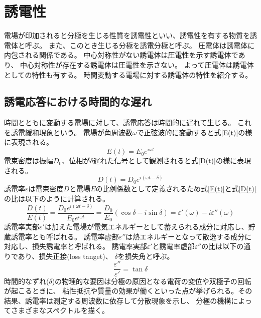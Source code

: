 \documentclass[dvipdfmx,12pt,a4paper]{jreport}
\begin{document}
			\newpage
		\section{誘電性}
		電場が印加されると分極を生じる性質を誘電性といい、誘電性を有する物質を誘電体と呼ぶ。
		また、このとき生じる分極を誘電分極と呼ぶ。
		圧電体は誘電体に内包される関係である。
		中心対称性がない誘電体は圧電性を示す誘電体であり、
		中心対称性が存在する誘電体は圧電性を示さない。
		よって圧電体は誘電体としての特性も有する。
		時間変動する電場に対する誘電体の特性を紹介する。
			\subsection{誘電応答における時間的な遅れ}
			時間とともに変動する電場に対して、誘電応答は時間的に遅れて生じる。
			これを誘電緩和現象という。
			電場が角周波数$\omega$で正弦波的に変動すると式\ref{E(t)}の様に表現される。
			\begin{equation}
				E(t)=E_0 e^{i\omega t}
				\label{E(t)}
			\end{equation}
			電束密度は振幅$D_0$、位相が$\delta$遅れた信号として観測されると式\ref{D(t)}の様に表現される。
			\begin{equation}
				D(t)=D_0 e^{i(\omega t-\delta)}
				\label{D(t)}
			\end{equation}
			誘電率$\varepsilon$は電束密度$D$と電場$E$の比例係数として定義されるため式\ref{E(t)}と式\ref{D(t)}
			の比は以下のように計算される。
			\begin{equation}
				\frac{D(t)}{E(t)}=\frac{D_0e^{i(\omega t-\delta)}}{E_0 e^{i\omega t}}
				=\frac{D_0}{E_0}\left(\cos\delta-i\sin\delta\right)=\varepsilon'(\omega)-i\varepsilon''(\omega)
			\end{equation}
			誘電率実部$\varepsilon'$は加えた電場が電気エネルギーとして蓄えられる成分に対応し、貯蔵誘電率とも呼ばれる。
			誘電率虚部$\varepsilon''$は熱エネルギーとなって散逸する成分に対応し、損失誘電率と呼ばれる。
			誘電率実部$\varepsilon'$と誘電率虚部$\varepsilon''$の比は以下の通りであり、損失正接(loss tanget)、
			$\delta$を損失角と呼ぶ。
			\begin{equation}
				\frac{\varepsilon''}{\varepsilon'}=\tan\delta
				\label{tandel}
			\end{equation}
			時間的なずれ($\delta$)の物理的な要因は分極の原因となる電荷の変位や双極子の回転が起こるときに、
			粘性抵抗や質量の効果が働くといった点が挙げられる。その結果、誘電率は測定する周波数に依存して分散現象を示し、
			分極の機構によってさまざまなスペクトルを描く。
\end{document}
